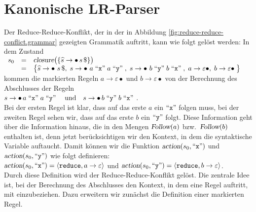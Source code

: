 \section{Kanonische LR-Parser}
Der Reduce-Reduce-Konflikt, der in der in Abbildung \ref{fig:reduce-reduce-conflict.grammar}
gezeigten Grammatik auftritt, kann wie folgt gel\"ost werden:  In dem Zustand
\\[0.2cm]
\hspace*{1.3cm}
$
\begin{array}[t]{lcl}
 s_0 & = & \textsl{closure}\bigl( \{ \widehat{s} \rightarrow \bullet\, s\,\symbol{36} \}\bigr) \\
     & = & \bigl\{ \widehat{s} \rightarrow \bullet\,\, s\,\symbol{36},\;
                   s \rightarrow \bullet\,\, a \quoted{x} a \quoted{y},\;
                   s \rightarrow \bullet\,\, b \quoted{y} b \quoted{x},\;
                   a \rightarrow \varepsilon \bullet, \;
                   b \rightarrow \varepsilon \bullet \;
            \bigr\}
 \end{array}$
\\[0.2cm]
kommen die markierten Regeln $a \rightarrow \varepsilon \bullet$ und $b \rightarrow
\varepsilon\bullet$ von der Berechnung des Abschlusses der Regeln 
\\[0.2cm]
\hspace*{1.3cm}
$s \rightarrow \bullet\, a \;\mbox{``\texttt{x}''}\; a \;\mbox{``\texttt{y}''}\; \quad \mbox{und} \quad 
 s \rightarrow \bullet\, b \;\mbox{``\texttt{y}''}\; b \;\mbox{``\texttt{x}''}\;$.
\\[0.2cm]
Bei der ersten Regel ist klar, dass auf das erste $a$ ein $\mbox{``\texttt{x}''}$ folgen muss, bei der zweiten Regel
sehen wir, dass auf das erste $b$ ein $\mbox{``\texttt{y}''}$ folgt.  Diese Information geht \"uber die Information
hinaus, die in den Mengen $\textsl{Follow}(a)$ bzw.~$\textsl{Follow}(b)$ enthalten ist, denn jetzt
ber\"ucksichtigen wir den Kontext, in dem die syntaktische Variable auftaucht.  Damit k\"onnen wir die
Funktion $\textsl{action}(s_0, \mbox{``\texttt{x}''})$ und $\textsl{action}(s_0, \mbox{``\texttt{y}''})$ wie folgt definieren:
\\[0.2cm]
\hspace*{1.3cm}
$\textsl{action}(s_0, \mbox{``\texttt{x}''}) = \langle \texttt{reduce}, a \rightarrow \varepsilon \rangle$
\quad \mbox{und} \quad 
$\textsl{action}(s_0, \mbox{``\texttt{y}''}) = \langle \texttt{reduce}, b \rightarrow \varepsilon \rangle$. 
\\[0.2cm]
Durch diese Definition wird der Reduce-Reduce-Konflikt gel\"ost.  Die zentrale Idee ist,
bei der Berechnung des Abschlusses den Kontext, in dem eine Regel auftritt, mit einzubeziehen.
Dazu erweitern wir zun\"achst die Definition einer markierten Regel.

